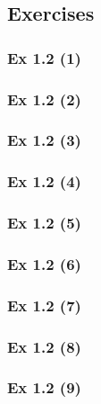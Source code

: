 \subsection*{Exercises}\label{sec:1.2_Exercises}

\subsubsection{Ex 1.2 (1)}\label{sec:Ex_1.2.1}

\subsubsection{Ex 1.2 (2)}\label{sec:Ex_1.2.2}

\subsubsection{Ex 1.2 (3)}\label{sec:Ex_1.2.3}

\subsubsection{Ex 1.2 (4)}\label{sec:Ex_1.2.4}

\subsubsection{Ex 1.2 (5)}\label{sec:Ex_1.2.5}

\subsubsection{Ex 1.2 (6)}\label{sec:Ex_1.2.6}

\subsubsection{Ex 1.2 (7)}\label{sec:Ex_1.2.7}

\subsubsection{Ex 1.2 (8)}\label{sec:Ex_1.2.8}

\subsubsection{Ex 1.2 (9)}\label{sec:Ex_1.2.9}

